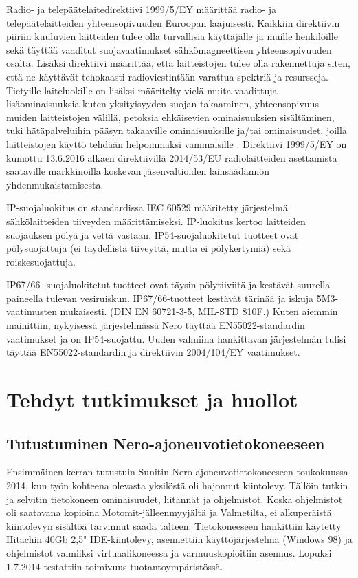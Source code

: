 Radio- ja telepäätelaitedirektiivi 1999/5/EY määrittää radio- ja
telepäätelaitteiden yhteensopivuuden Euroopan laajuisesti. Kaikkiin
direktiivin piiriin kuuluvien laitteiden tulee olla turvallisia
käyttäjälle ja muille henkilöille sekä täyttää vaaditut
suojavaatimukset sähkömagneettisen yhteensopivuuden osalta. Lisäksi
direktiivi määrittää, että laitteistojen tulee olla rakennettuja siten,
että ne käyttävät tehokaasti radioviestintään varattua spektriä ja
resursseja. Tietyille laiteluokille on lisäksi määritelty vielä muita
vaadittuja lisäominaisuuksia kuten yksityisyyden suojan takaaminen,
yhteensopivuus muiden laitteistojen välillä, petoksia
ehkäisevien ominaisuuksien sisältäminen, tuki hätäpalveluihin pääsyn takaaville
ominaisuuksille ja/tai ominaisuudet, joilla laitteistojen
käyttö tehdään helpommaksi vammaisille \cite{1999/5/EY}. Direktiivi
1999/5/EY on kumottu 13.6.2016 alkaen direktiivillä 2014/53/EU
radiolaitteiden asettamista saataville markkinoilla koskevan
jäsenvaltioiden lainsäädännön yhdenmukaistamisesta. \cite{2014/53/EU}

IP-suojaluokitus on standardissa IEC 60529 määritetty järjestelmä sähkölaitteiden tiiveyden määrittämiseksi. IP-luokitus kertoo laitteiden suojauksen pölyä ja vettä vastaan. \cite{IEC60529} IP54-suojaluokitetut tuotteet ovat pölysuojattuja (ei täydellistä tiiveyttä, mutta ei pölykertymiä) sekä roiskesuojattuja.

IP67/66 -suojaluokitetut tuotteet ovat täysin pölytiiviitä ja kestävät suurella paineella tulevan vesiruiskun. IP67/66-tuotteet kestävät tärinää ja iskuja 5M3-vaatimusten mukaisesti. (DIN EN 60721-3-5, MIL-STD 810F.) Kuten aiemmin mainittiin, nykyisessä järjestelmässä Nero täyttää EN55022-standardin vaatimukset ja on IP54-suojattu. Uuden valmiina hankittavan järjestelmän tulisi täyttää EN55022-standardin ja direktiivin  2004/104/EY vaatimukset.

\newpage
\chapter{Tehdyt tutkimukset ja huollot}

\section{Tutustuminen Nero-ajoneuvotietokoneeseen}

Ensimmäinen kerran tutustuin Sunitin Nero-ajoneuvotietokoneeseen toukokuussa 2014, kun työn kohteena olevasta yksilöstä oli hajonnut kiintolevy. Tällöin tutkin ja selvitin tietokoneen ominaisuudet, liitännät ja ohjelmistot. Koska ohjelmistot oli saatavana kopioina Motomit-jälleenmyyjältä ja Valmetilta, ei alkuperäistä kiintolevyn sisältöä tarvinnut saada talteen. Tietokoneeseen hankittiin käytetty Hitachin 40Gb 2,5" IDE-kiintolevy, asennettiin käyttöjärjestelmä (Windows 98) ja ohjelmistot valmiiksi virtuaalikoneessa ja varmuuskopioitiin asennus. Lopuksi 1.7.2014 testattiin toimivuus tuotantoympäristössä.

